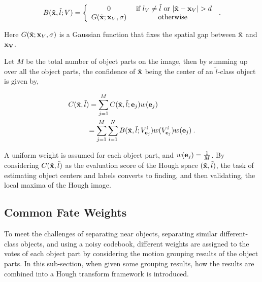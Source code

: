 \begin{equation}
B(\tilde{\bf{x}},\tilde l;V)
= \left\{ \begin{array}{*{20}{c}}
   0   &\mbox{  if } {l_V} \ne \tilde{l} \mbox{ or } |\tilde{\bf{x}} - {\bf{x}}_V| > d   \\
   G(\tilde{\bf{x}};{{\bf{x}}_V},\sigma) &\mbox{otherwise}
\end{array} \right. \:.
\label{eq2}
\end{equation}

Here $G(\tilde{\bf{x}};{\bf{x}}_V,\sigma )$ is a Gaussian function that fixes the spatial gap between $\tilde{\bf{x}}$ and ${\bf{x}_V}$.

Let $M$ be the total number of object parts on the image, then by summing up over all the object parts, the confidence of $\tilde{\bf{x}}$ being the center of an $\tilde{l}$-class object is given by,


\begin{equation}
\begin{aligned}
C({\tilde{\bf{x}}},\tilde{l}) &=\sum\limits^M_{j=1} C({\tilde{\bf{x}}},\tilde{l};{\bf{e}}_j)w({\bf{e}}_j) \\
&{
\begin{aligned}
=\sum\limits^M_{j=1} \sum\limits^N_{i=1} {B({\tilde{\bf{x}}},{\tilde{l}};{V_{{\bf{e}}_j}^i}) w({V_{{\bf{e}}_j}^i})w({\bf{e}}_j)} \:.
\end{aligned}
}
\end{aligned}
\label{eq3}
\end{equation}

A uniform weight is assumed for each object part, and $w({\bf{e}}_j)=\frac 1 M$. By considering $C({\tilde{\bf{x}}},\tilde{l})$ as the evaluation score of the Hough space $({\tilde{\bf{x}}},\tilde{l})$, the task of estimating object centers and labels converts to finding, and then validating, the local maxima of the Hough image.

\subsection{Common Fate Weights}

To meet the challenges of separating near objects, separating similar different-class objects, and using a noisy codebook,  different weights are assigned to the votes of each object part by considering the motion grouping results of the object parts. In this sub-section, when given some grouping results, how the results are combined into a Hough transform framework is introduced.


